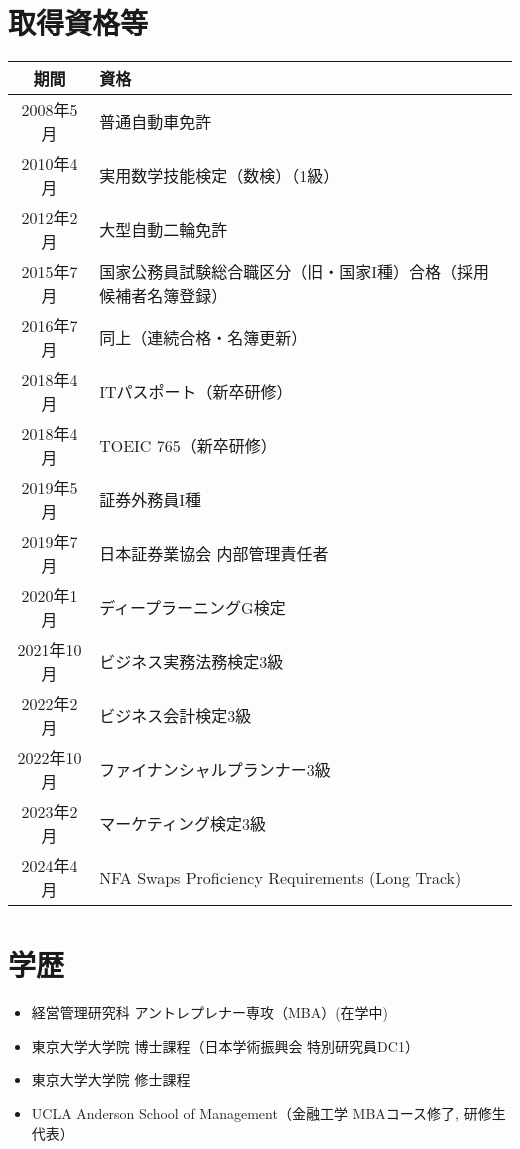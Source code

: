 \documentclass[uplatex,a4j,10.5pt,dvipdfmx]{jsarticle}
\begin{document}
\section{取得資格等}

\begin{longtable}{|c|l|}
	\hline
	\centering\textbf{期間} & \textbf{資格}                                     \\
	\hline
	\endhead

	\hline
	2008年5月               & 普通自動車免許                                         \\
	\hline
	2010年4月               & 実用数学技能検定（数検）（1級）                                \\
	\hline
	2012年2月               & 大型自動二輪免許                                        \\
	\hline
	2015年7月               & 国家公務員試験総合職区分（旧・国家I種）合格（採用候補者名簿登録）               \\
	\hline
	2016年7月               & 同上（連続合格・名簿更新）                                   \\
	\hline
	2018年4月               & ITパスポート（新卒研修）                                   \\
	\hline
	2018年4月               & TOEIC 765（新卒研修）                                 \\
	\hline
	2019年5月               & 証券外務員I種                                         \\
	\hline
	2019年7月               & 日本証券業協会 内部管理責任者                                 \\
	\hline
	2020年1月               & ディープラーニングG検定                                    \\
	\hline
	2021年10月              & ビジネス実務法務検定3級                                    \\
	\hline
	2022年2月               & ビジネス会計検定3級                                      \\
	\hline
	2022年10月              & ファイナンシャルプランナー3級                                 \\
	\hline
	2023年2月               & マーケティング検定3級                                     \\
	\hline
	2024年4月               & NFA Swaps Proficiency Requirements (Long Track) \\
	\hline
\end{longtable}

\section{学歴}
\begin{itemize}
	\item 経営管理研究科 アントレプレナー専攻（MBA）(在学中)
    \item 東京大学大学院 博士課程（日本学術振興会 特別研究員DC1）
	\item 東京大学大学院 修士課程
	\item UCLA Anderson School of Management（金融工学 MBAコース修了, 研修生代表）
\end{itemize}
\end{document}
